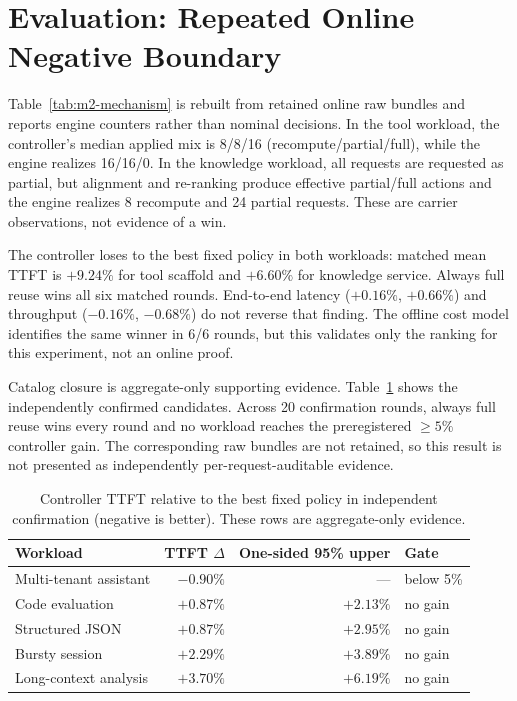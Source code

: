 \documentclass[conference]{IEEEtran}
\begin{document}
\section{Evaluation: Repeated Online Negative Boundary}
Table~\ref{tab:m2-mechanism} is rebuilt from retained online raw bundles and
reports engine counters rather than nominal decisions. In the tool workload,
the controller's median applied mix is 8/8/16 (recompute/partial/full), while
the engine realizes 16/16/0. In the knowledge workload, all requests are
requested as partial, but alignment and re-ranking produce effective
partial/full actions and the engine realizes 8 recompute and 24 partial
requests. These are carrier observations, not evidence of a win.
\begin{table}[t]
\centering
\caption{Median per-lifecycle online mechanism decomposition. Engine counters,
not requested actions, define avoided prefill and recomputed tail. Positive
latency deltas and negative RPS deltas are regressions.}
\label{tab:m2-mechanism}
\scriptsize
\resizebox{\textwidth}{!}{}
\par\smallskip
\resizebox{0.78\textwidth}{!}{}
\end{table}

The controller loses to the best fixed policy in both workloads: matched mean
TTFT is $+9.24\%$ for tool scaffold and $+6.60\%$ for knowledge service.
Always full reuse wins all six matched rounds. End-to-end latency
($+0.16\%$, $+0.66\%$) and throughput ($-0.16\%$, $-0.68\%$) do not reverse
that finding. The offline cost model identifies the same winner in 6/6 rounds,
but this validates only the ranking for this experiment, not an online proof.

Catalog closure is aggregate-only supporting evidence. Table~\ref{tab:confirmation}
shows the independently confirmed candidates. Across 20 confirmation rounds,
always full reuse wins every round and no workload reaches the preregistered
$\geq 5\%$ controller gain. The corresponding raw bundles are not retained, so
this result is not presented as independently per-request-auditable evidence.

\begin{table}[t]
\centering
\caption{Controller TTFT relative to the best fixed policy in independent
confirmation (negative is better). These rows are aggregate-only evidence.}
\label{tab:confirmation}
\scriptsize
\begin{tabular}{lrrl}
\toprule
Workload & TTFT $\Delta$ & One-sided 95\% upper & Gate \\
\midrule
Multi-tenant assistant & $-0.90\%$ & --- & below 5\% \\
Code evaluation & $+0.87\%$ & $+2.13\%$ & no gain \\
Structured JSON & $+0.87\%$ & $+2.95\%$ & no gain \\
Bursty session & $+2.29\%$ & $+3.89\%$ & no gain \\
Long-context analysis & $+3.70\%$ & $+6.19\%$ & no gain \\
\bottomrule
\end{tabular}
\end{table}
\end{document}
